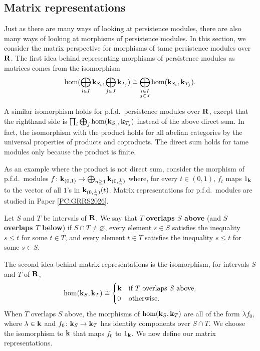 \subsection{Matrix representations}
\label{SS:matrix-representations}

Just as there are many ways of looking at persistence modules, there are also many ways of looking at morphisms of persistence modules. In this section, we consider the matrix perspective for morphisms of tame persistence modules over $\mathbf{R}$. The first idea behind representing morphisms of persistence modules as matrices comes from the isomorphism
\[
\hom(\bigoplus_{i \in I} \mathbf{k}_{S_i}, \bigoplus_{j \in J} \mathbf{k}_{T_j}) \cong \bigoplus_{\substack{i \in I \\ j \in J}} \hom(\mathbf{k}_{S_i}, \mathbf{k}_{T_j}).
\]

\begin{remark}
  A similar isomorphism holds for p.f.d.\ persistence modules over $\mathbf{R}$, except that the righthand side is $\prod_i \bigoplus_j \hom(\mathbf{k}_{S_i}, \mathbf{k}_{T_j})$ instead of the above direct sum.
  In fact, the isomorphism with the product holds for all abelian categories by the universal properties of products and coproducts. The direct sum holds for tame modules only because the product is finite.
  
  As an example where the product is not direct sum, consider the morphism of p.f.d.\ modules $f \colon \mathbf{k}_{(0, 1)} \to \bigoplus_{n \geq 1} \mathbf{k}_{(0, \frac{1}{n})}$ where, for every $t \in (0, 1)$, $f_t$ maps $1_{\mathbf{k}}$ to the vector of all $1$'s in $\mathbf{k}_{(0, \frac{1}{n})}(t)$. Matrix representations for p.f.d.\ modules are studied in Paper \ref{PC:GRRS2026}.
\end{remark}

\begin{definition}
  Let $S$ and $T$ be intervals of $\mathbf{R}$. We say that $T$ \textbf{overlaps $S$ above} (and $S$ \textbf{overlaps $T$ below}) if $S \cap T \neq \varnothing$, every element $s \in S$ satisfies the inequality $s \leq t$ for some $t \in T$, and every element $t \in T$ satisfies the inequality $s \leq t$ for some $s \in S$.
\end{definition}

The second idea behind matrix representations is the isomorphism, for intervals $S$ and $T$ of $\mathbf{R}$,
\begin{equation}
\label{Eq:coef-space}
  \hom(\mathbf{k}_{S}, \mathbf{k}_{T}) \cong \begin{cases}
    \mathbf{k} & \text{if $T$ overlaps $S$ above}, \\
    0 & \text{otherwise}.
  \end{cases}
\end{equation}
When $T$ overlaps $S$ above, the morphisms of $\hom(\mathbf{k}_{S}, \mathbf{k}_{T})$ are all of the form $\lambda f_0$, where $\lambda \in \mathbf{k}$ and $f_0 \colon \mathbf{k}_S \to \mathbf{k}_T$ has identity components over $S \cap T$. We choose the isomorphism to $\mathbf{k}$ that maps $f_0$ to $1_{\mathbf{k}}$. We now define our matrix representations.

